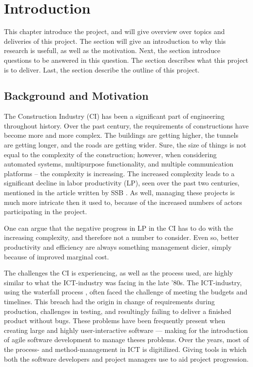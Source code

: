 \chapter{Introduction}

This chapter introduce the project, and will give overview over topics and deliveries of this project. The  section will give an introduction to why this research is usefull, as well as the motivation. Next, the  section introduce questions to be answered in this question. The  section describes what this project is to deliver. Last, the  section describe the outline of this project.

\section{Background and Motivation} \label{sec:background}
The Construction Industry (CI) has been a significant part of engineering throughout history. Over the past century, the requirements of constructions have become more and more complex. The buildings are getting higher, the tunnels are getting longer, and the roads are getting wider. Sure, the size of things is not equal to the complexity of the construction; however, when considering automated systems, multipurpose functionality, and multiple communication platforms – the complexity is increasing. The increased complexity leads to a significant decline in labor productivity (LP), seen over the past two centuries, mentioned in the article written by SSB \cite{productivity}. As well, managing these projects is much more intricate then it used to, because of the increased numbers of actors participating in the project. 

One can argue that the negative progress in LP in the CI has to do with the increasing complexity, and therefore not a number to consider. Even so, better productivity and efficiency are always something management dicier, simply because of improved marginal cost.

The challenges the CI is experiencing, as well as the process used, are highly similar to what the ICT-industry was facing in the late '80s. The ICT-industry, using the waterfall process \cite{royce}, often faced the challenge of meeting the budgets and timelines. This breach had the origin in change of requirements during production, challenges in testing, and resultingly failing to deliver a finished product without bugs. These problems have been frequently present when creating large and highly user-interactive software — making for the introduction of agile software development to manage theses problems. Over the years, most of the process- and method-management in ICT is digitilized. Giving tools in which both the software developers and project managers use to aid project progression.  


